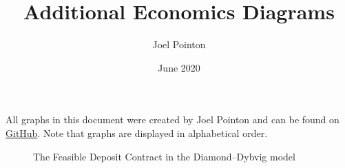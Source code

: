 \documentclass{article}
\title{Additional Economics Diagrams}
\author{Joel Pointon}
\date{June 2020}
\begin{document}
\maketitle
All graphs in this document were created by Joel Pointon and can be found on \href{https://github.com/pointonjoel/TeXonomics}{GitHub}. Note that graphs are displayed in alphabetical order.

\listoffigures

\pagebreak

\begin{figure}[H]
    \centering
    
    \caption{The Feasible Deposit Contract in the Diamond–Dybvig model}
    \label{fig:1}
\end{figure}
\end{document}
